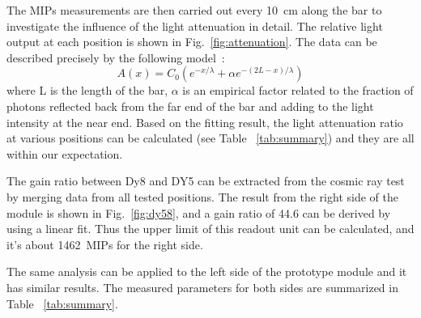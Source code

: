 \documentclass[preprint, times]{elsarticle}
\begin{document}
The MIPs measurements are then carried out every \SI{10}{\centi\meter} along the bar to investigate the influence of the light attenuation in detail.
The relative light output at each position is shown in Fig.~\ref{fig:attenuation}.
The data can be described precisely by the following model~\cite{taiuti_measurement_1996}:
\begin{equation}
A(x)=C_0(e^{-x/\lambda} + \alpha e^{-(2L-x)/\lambda})
\end{equation}
where L is the length of the bar, $\alpha$ is an empirical factor related to the fraction of photons reflected back from the far end of the bar and adding to the light intensity at the near end.
Based on the fitting result, the light attenuation ratio at various positions can be calculated (see Table ~\ref{tab:summary}) and they are all within our expectation.

The gain ratio between Dy8 and DY5 can be extracted from the cosmic ray test by merging data from all tested positions.
The result from the right side of the module is shown in Fig.~\ref{fig:dy58}, and a gain ratio of 44.6 can be derived by using a linear fit. Thus the upper limit of this readout unit can be calculated, and it's about  \SI{1462}{MIPs} for the right side.

The same analysis can be applied to the left side of the prototype module and it has similar results. The measured parameters for both sides are summarized in Table ~\ref{tab:summary}.

\end{document}
